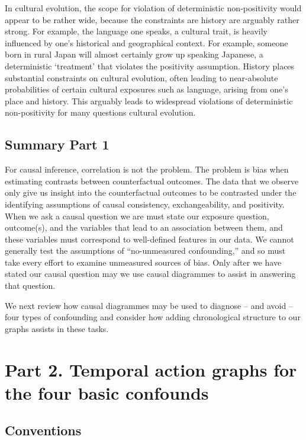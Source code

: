 \documentclass[
  singlecolumn]{report}
\begin{document}
In cultural evolution, the scope for violation of deterministic
non-positivity would appear to be rather wide, because the constraints
are history are arguably rather strong. For example, the language one
speaks, a cultural trait, is heavily influenced by one's historical and
geographical context. For example, someone born in rural Japan will
almost certainly grow up speaking Japanese, a deterministic `treatment'
that violates the positivity assumption. History places substantial
constraints on cultural evolution, often leading to near-absolute
probabilities of certain cultural exposures such as language, arising
from one's place and history. This arguably leads to widespread
violations of deterministic non-positivity for many questions cultural
evolution.

\hypertarget{summary-part-1}{%
\subsection{Summary Part 1}\label{summary-part-1}}

For causal inference, correlation is not the problem. The problem is
bias when estimating contrasts between counterfactual outcomes. The data
that we observe only give us insight into the counterfactual outcomes to
be contrasted under the identifying assumptions of causal consistency,
exchangeability, and positivity. When we ask a causal question we are
must state our exposure question, outcome(s), and the variables that
lead to an association between them, and these variables must correspond
to well-defined features in our data. We cannot generally test the
assumptions of ``no-unmeasured confounding,'' and so must take every
effort to examine unmeasured sources of bias. Only after we have stated
our causal question may we use causal diagrammes to assist in answering
that question.

We next review how causal diagrammes may be used to diagnose -- and
avoid -- four types of confounding and consider how adding chronological
structure to our graphs assists in these tasks.

\hypertarget{part-2.-temporal-action-graphs-for-the-four-basic-confounds}{%
\section{Part 2. Temporal action graphs for the four basic
confounds}\label{part-2.-temporal-action-graphs-for-the-four-basic-confounds}}

\hypertarget{conventions}{%
\subsection{Conventions}\label{conventions}}
\end{document}
